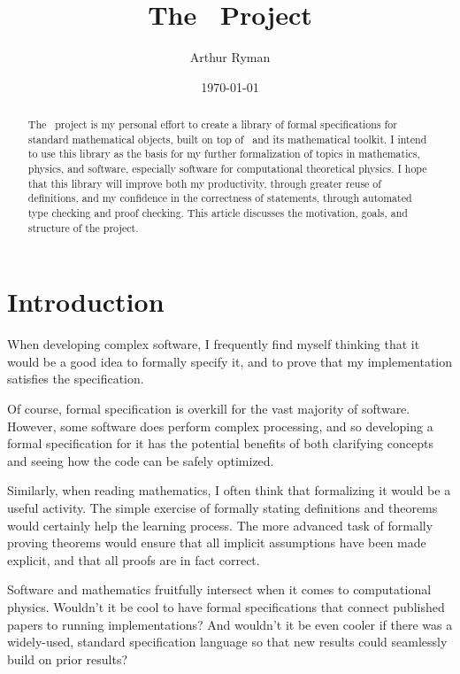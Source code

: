 \documentclass{amsart}
\begin{document}
\title{The \mathz\ Project}
\author{Arthur Ryman}
\date{\today}

\begin{abstract}
The \mathz\ project is my personal effort to create a library of formal specifications for standard mathematical objects,
built on top of \ZN\ and its mathematical toolkit.
I intend to use this library as the basis for my further formalization of topics in mathematics, physics, and software,
especially software for computational theoretical physics.
I hope that this library will improve both 
my productivity, through greater reuse of definitions, and 
my confidence in the correctness of statements, through automated type checking and proof checking.
This article discusses the motivation, goals, and structure of the project.
\end{abstract}

\maketitle

\tableofcontents

\section{Introduction}

When developing complex software, I frequently find myself thinking that it would be a good idea to formally specify it,
and to prove that
my implementation satisfies the specification.

Of course, formal specification is overkill for the vast majority of software.
However, some software does perform complex processing, 
and so developing a formal specification for it has the potential benefits of
both clarifying concepts and seeing how the code can be safely optimized.

Similarly, when reading mathematics, I often think that formalizing it would be a useful activity.
The simple exercise of formally stating definitions and theorems would certainly help the learning process.
The more advanced task of formally proving theorems would ensure that all implicit assumptions have been made explicit,
and that all proofs are in fact correct.

Software and mathematics fruitfully intersect when it comes to computational physics.
Wouldn't it be cool to have formal specifications that connect published papers to running implementations?
And wouldn't it be even cooler if there was a widely-used, standard specification language so that new results could 
seamlessly build on prior results?
\end{document}
